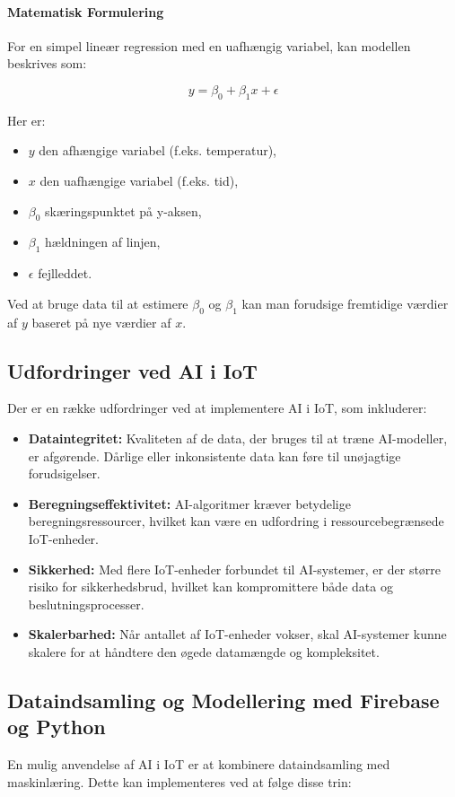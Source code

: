 \documentclass[12pt,a4paper]{book}
\begin{document}
	\paragraph{Matematisk Formulering}
	For en simpel lineær regression med en uafhængig variabel, kan modellen beskrives som:
	
	\[
	y = \beta_0 + \beta_1 x + \epsilon
	\]
	
	Her er:
	\begin{itemize}
		\item \(y\) den afhængige variabel (f.eks. temperatur),
		\item \(x\) den uafhængige variabel (f.eks. tid),
		\item \(\beta_0\) skæringspunktet på y-aksen,
		\item \(\beta_1\) hældningen af linjen,
		\item \(\epsilon\) fejlleddet.
	\end{itemize}
	\noindent Ved at bruge data til at estimere \(\beta_0\) og \(\beta_1\) kan man forudsige fremtidige værdier af \(y\) baseret på nye værdier af \(x\).
	
	\subsection{Udfordringer ved AI i IoT}
	Der er en række udfordringer ved at implementere AI i IoT, som inkluderer:
	\begin{itemize}
		\item \textbf{Dataintegritet:} Kvaliteten af de data, der bruges til at træne AI-modeller, er afgørende. Dårlige eller inkonsistente data kan føre til unøjagtige forudsigelser.
		\item \textbf{Beregningseffektivitet:} AI-algoritmer kræver betydelige beregningsressourcer, hvilket kan være en udfordring i ressourcebegrænsede IoT-enheder.
		\item \textbf{Sikkerhed:} Med flere IoT-enheder forbundet til AI-systemer, er der større risiko for sikkerhedsbrud, hvilket kan kompromittere både data og beslutningsprocesser.
		\item \textbf{Skalerbarhed:} Når antallet af IoT-enheder vokser, skal AI-systemer kunne skalere for at håndtere den øgede datamængde og kompleksitet.
	\end{itemize}
	
	\subsection{Dataindsamling og Modellering med Firebase og Python}
	En mulig anvendelse af AI i IoT er at kombinere dataindsamling med maskinlæring. Dette kan implementeres ved at følge disse trin:
	
\end{document}
